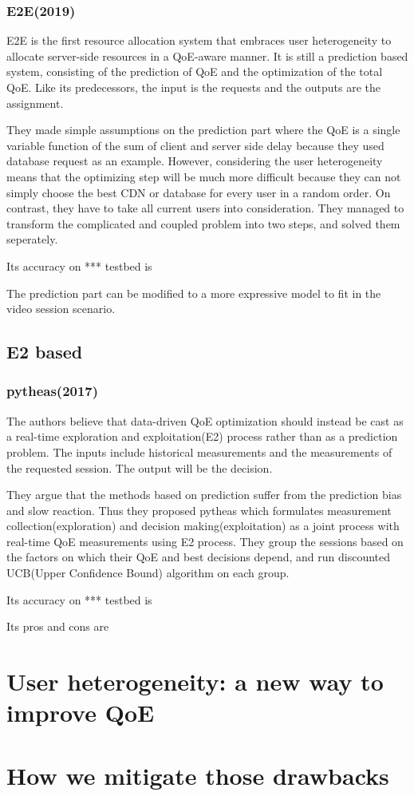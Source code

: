 \documentclass{ctexart}
\begin{document}
\subsubsection{E2E(2019)\cite{DBLP:conf/sigcomm/Zhang0KGJ19}}
\par E2E is the first resource allocation system that embraces user heterogeneity to allocate server-side resources in a QoE-aware manner. It is still a prediction based system, consisting of the prediction of QoE and the optimization of the total QoE. Like its predecessors, the input is the requests and the outputs are the assignment.
\par They made simple assumptions on the prediction part where the QoE is a single variable function of the sum of client and server side delay because they used database request as an example. However, considering the user heterogeneity means that the optimizing step will be much more difficult because they can not simply choose the best CDN or database for every user in a random order. On contrast, they have to take all current users into consideration. They managed to transform the complicated and coupled problem into two steps, and solved them seperately.
\par Its accuracy on *** testbed is 
\par The prediction part can be modified to a more expressive model to fit in the video session scenario.
\subsection{E2 based}
\subsubsection{pytheas(2017)\cite{201473}}
\par The authors believe that data-driven QoE optimization should instead be cast as a real-time exploration and exploitation(E2) process rather than as a prediction problem. The inputs include historical measurements and the measurements of the requested session. The output will be the decision.
\par They argue that the methods based on prediction suffer from the prediction bias and slow reaction. Thus they proposed pytheas which formulates measurement collection(exploration) and decision making(exploitation) as a joint process with real-time QoE measurements using E2 process. They group the sessions based on the factors on which their QoE and best decisions depend, and run discounted UCB(Upper Confidence Bound) algorithm on each group.
\par Its accuracy on *** testbed is 
\par Its pros and cons are
\section{User heterogeneity: a new way to improve QoE}
\section{How we mitigate those drawbacks}


\nocite{*}


\end{document}
